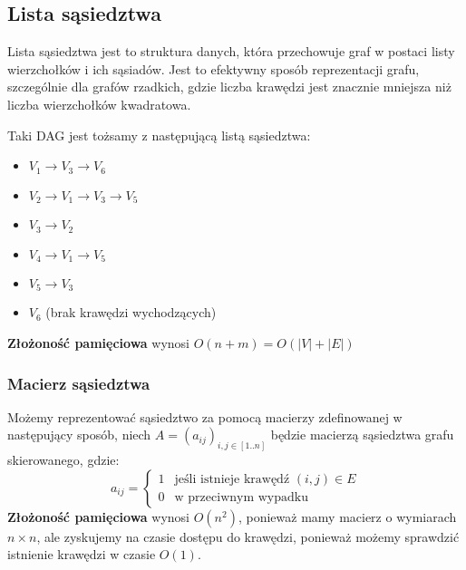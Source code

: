\documentclass[11pt,a4paper]{article}
\begin{document}
\subsection{Lista sąsiedztwa}
Lista sąsiedztwa jest to struktura danych, która przechowuje graf w postaci listy wierzchołków i ich sąsiadów. Jest to efektywny sposób reprezentacji grafu, szczególnie dla grafów rzadkich, gdzie liczba krawędzi jest znacznie mniejsza niż liczba wierzchołków kwadratowa.

\begin{center}\end{center}
Taki DAG jest tożsamy z następującą listą sąsiedztwa:
\begin{itemize}
    \item $V_1 \to V_3 \to V_6$
    \item $V_2 \to V_1 \to V_3 \to V_5$
    \item $V_3 \to V_2$
    \item $V_4 \to V_1 \to V_5$
    \item $V_5 \to V_3$
    \item $V_6$ (brak krawędzi wychodzących)
\end{itemize}
\textbf{Złożoność pamięciowa} wynosi $O(n+m)=O(|V|+|E|)$

\subsubsection{Macierz sąsiedztwa}
Możemy reprezentować sąsiedztwo za pomocą macierzy zdefinowanej w następujący sposób, niech $A=(a_{ij})_{i,j \in [1..n]}$ będzie macierzą sąsiedztwa grafu skierowanego, gdzie:
\[
    a_{ij} = \begin{cases}
        1 & \text{jeśli istnieje krawędź } (i,j) \in E \\
        0 & \text{w przeciwnym wypadku}
    \end{cases}
\]
\textbf{Złożoność pamięciowa} wynosi $O(n^2)$, ponieważ mamy macierz o wymiarach $n \times n$, ale zyskujemy na czasie dostępu do krawędzi, ponieważ możemy sprawdzić istnienie krawędzi w czasie $O(1)$.
\end{document}
